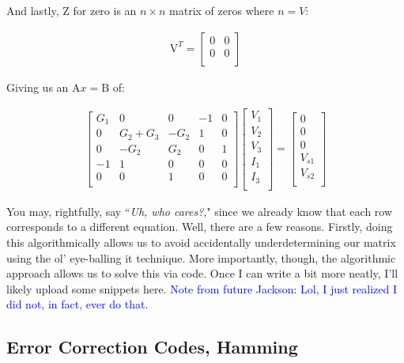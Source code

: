 And lastly, Z for zero is an $n \times n$ matrix of zeros where $n = V$:

\begin{align}
\mathrm{V}^T = 
\begin{bmatrix} 
0 & 0  \\
0 & 0   \\
\end{bmatrix}
\end{align}

Giving us an $\mathrm{A}x = \mathrm{B}$ of: 

\begin{align}
\begin{bmatrix} 
G_1 & 0 & 0 & -1 & 0 \\
0 & G_2 + G_3 & -G_2 & 1 & 0  \\
0 & -G_2 & G_2 & 0 & 1  \\
-1 & 1 & 0 & 0 & 0  \\
0 & 0  & 1 & 0 & 0  \\
\end{bmatrix}
\begin{bmatrix} 
V_1 \\
V_2  \\
V_3  \\
I_1  \\
I_3 \\
\end{bmatrix}
=
\begin{bmatrix} 
0 \\
0  \\
0  \\
V_{s1}  \\
V_{s2} \\
\end{bmatrix}
\end{align}

You may, rightfully, say ``\textit{Uh, who cares?}," since we already know that each row corresponds to a different equation. Well, there are a few reasons. Firstly, doing this algorithmically allows us to avoid accidentally underdetermining our matrix using the ol' eye-balling it technique. More importantly, though, the algorithmic approach allows us to solve this via code. Once I can write a bit more neatly, I'll likely upload some snippets here. \textcolor{blue}{Note from future Jackson: Lol, I just realized I did not, in fact, ever do that.}


\subsection{Error Correction Codes, Hamming}

